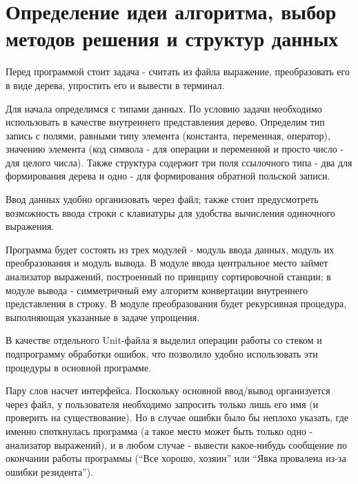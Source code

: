 \section{Определение идеи алгоритма, выбор методов решения и структур данных}
\par
Перед программой стоит задача - считать из файла выражение, преобразовать его
в виде дерева, упростить его и вывести в терминал.
\par
Для начала определимся с типами данных. По условию задачи необходимо
использовать в качестве внутреннего представления дерево. Определим тип запись
с полями, равными типу элемента (константа, переменная, оператор), значению
элемента (код символа - для операции и переменной и просто число - для целого
числа). Также структура содержит три поля ссылочного типа - два для
формирования дерева и одно - для формирования обратной польской записи.
\par
Ввод данных удобно организовать через файл; также стоит предусмотреть
возможность ввода строки с клавиатуры для удобства вычисления одиночного
выражения.
\par
Программа будет состоять из трех модулей - модуль ввода данных, модуль их
преобразования и модуль вывода. В модуле ввода центральное место займет
анализатор выражений, построенный по принципу сортировочной станции; в
модуле вывода - симметричный ему алгоритм
конвертации внутреннего представления в строку. В модуле преобразования
будет рекурсивная процедура, выполняющая указанные в задаче упрощения.
\par
В качестве отдельного Unit-файла я выделил операции работы со стеком и
подпрограмму обработки ошибок, что позволило удобно использовать эти процедуры
в основной программе.
\par
Пару слов насчет интерфейса. Поскольку основной ввод/вывод организуется через
файл, у пользователя необходимо запросить только лишь его имя (и проверить на
существование). Но в случае ошибки было бы неплохо указать, где именно
споткнулась программа (а такое место может быть только одно - анализатор
выражений), и в любом случае - вывести какое-нибудь сообщение по окончании
работы программы (``Все хорошо, хозяин'' или ``Явка провалена из-за ошибки
резидента'').
\pagebreak

